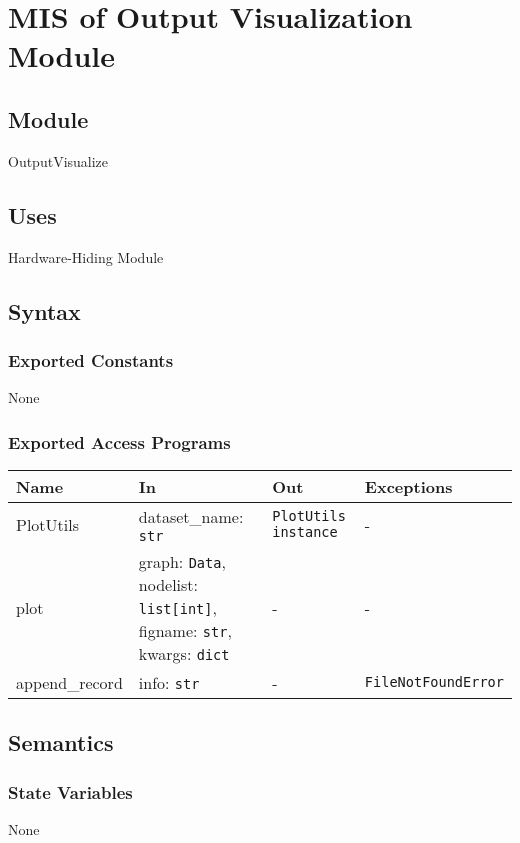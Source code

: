 \documentclass[12pt, titlepage]{article}
\begin{document}
\section{MIS of Output Visualization Module} \label{OutputVisualization}

\subsection{Module}
OutputVisualize

\subsection{Uses}
Hardware-Hiding Module

\subsection{Syntax}

\subsubsection{Exported Constants}
None

\subsubsection{Exported Access Programs}

\begin{center}
\begin{tabular}{p{3cm} p{5cm} p{4.5cm} p{3cm}}
\hline
\textbf{Name} & \textbf{In} & \textbf{Out} & \textbf{Exceptions} \\
\hline
PlotUtils & dataset\_name: \texttt{str} & \texttt{PlotUtils instance} & - \\
plot & graph: \texttt{Data}, nodelist: \texttt{list[int]}, figname: \texttt{str}, kwargs: \texttt{dict} & - & - \\
append\_record & info: \texttt{str} & - & \texttt{FileNotFoundError} \\
\hline
\end{tabular}
\end{center}

\subsection{Semantics}

\subsubsection{State Variables}
None
\end{document}
